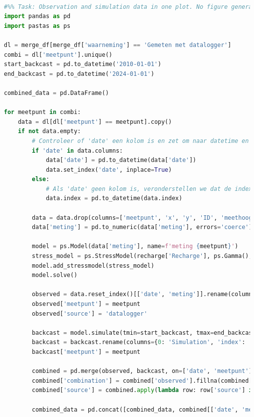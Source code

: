 \begin{lstlisting}[language=Python]
                
#%% Task: Observation and simulation data in one plot. No figure generated. 
import pandas as pd
import pastas as ps

dl = merge_df[merge_df['waarneming'] == 'Gemeten met datalogger']
combi = dl['meetpunt'].unique()
start_backcast = pd.to_datetime('2010-01-01')
end_backcast = pd.to_datetime('2024-01-01')

combined_data = pd.DataFrame()

for meetpunt in combi:
    data = dl[dl['meetpunt'] == meetpunt].copy()
    if not data.empty:
        # Controleer of 'date' een kolom is en zet om naar datetime en stel in als index indien nodig
        if 'date' in data.columns:
            data['date'] = pd.to_datetime(data['date'])
            data.set_index('date', inplace=True)
        else:
            # Als 'date' geen kolom is, veronderstellen we dat de index al een datetime index is
            data.index = pd.to_datetime(data.index)
        
        data = data.drop(columns=['meetpunt', 'x', 'y', 'ID', 'meethoogte', 'waarneming'], errors='ignore')
        data['meting'] = pd.to_numeric(data['meting'], errors='coerce')
        
        model = ps.Model(data['meting'], name=f'meting {meetpunt}')
        stress_model = ps.StressModel(recharge['Recharge'], ps.Gamma(), name='recharge', settings='evap')
        model.add_stressmodel(stress_model)
        model.solve()
        
        observed = data.reset_index()[['date', 'meting']].rename(columns={'meting': 'observed'})
        observed['meetpunt'] = meetpunt
        observed['source'] = 'datalogger'
        
        backcast = model.simulate(tmin=start_backcast, tmax=end_backcast).reset_index()
        backcast = backcast.rename(columns={0: 'Simulation', 'index': 'date'})
        backcast['meetpunt'] = meetpunt
        
        combined = pd.merge(observed, backcast, on=['date', 'meetpunt'], how='outer')
        combined['combination'] = combined['observed'].fillna(combined['Simulation'])
        combined['source'] = combined.apply(lambda row: row['source'] if pd.notnull(row['observed']) else 'Simulation', axis=1)
        
        combined_data = pd.concat([combined_data, combined[['date', 'meetpunt', 'combination', 'source']]], ignore_index=True)



















\end{lstlisting}
